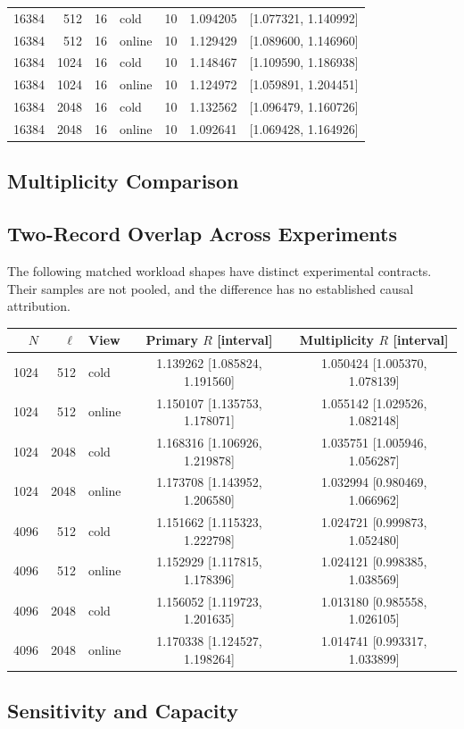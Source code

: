 \begin{longtable}{rrrlrrr}
16384 & 512 & 16 & cold & 10 & 1.094205 & [1.077321, 1.140992] \\
16384 & 512 & 16 & online & 10 & 1.129429 & [1.089600, 1.146960] \\
16384 & 1024 & 16 & cold & 10 & 1.148467 & [1.109590, 1.186938] \\
16384 & 1024 & 16 & online & 10 & 1.124972 & [1.059891, 1.204451] \\
16384 & 2048 & 16 & cold & 10 & 1.132562 & [1.096479, 1.160726] \\
16384 & 2048 & 16 & online & 10 & 1.092641 & [1.069428, 1.164926] \\
\bottomrule\end{longtable}\normalsize
\subsection{Multiplicity Comparison}

\subsection{Two-Record Overlap Across Experiments}
The following matched workload shapes have distinct experimental contracts. Their samples are not pooled, and the difference has no established causal attribution.
\begin{longtable}{rrlcc}
\toprule $N$ & $\ell$ & View & Primary $R$ [interval] & Multiplicity $R$ [interval] \\ \midrule
1024 & 512 & cold & 1.139262 [1.085824, 1.191560] & 1.050424 [1.005370, 1.078139] \\
1024 & 512 & online & 1.150107 [1.135753, 1.178071] & 1.055142 [1.029526, 1.082148] \\
1024 & 2048 & cold & 1.168316 [1.106926, 1.219878] & 1.035751 [1.005946, 1.056287] \\
1024 & 2048 & online & 1.173708 [1.143952, 1.206580] & 1.032994 [0.980469, 1.066962] \\
4096 & 512 & cold & 1.151662 [1.115323, 1.222798] & 1.024721 [0.999873, 1.052480] \\
4096 & 512 & online & 1.152929 [1.117815, 1.178396] & 1.024121 [0.998385, 1.038569] \\
4096 & 2048 & cold & 1.156052 [1.119723, 1.201635] & 1.013180 [0.985558, 1.026105] \\
4096 & 2048 & online & 1.170338 [1.124527, 1.198264] & 1.014741 [0.993317, 1.033899] \\
\bottomrule\end{longtable}
\subsection{Sensitivity and Capacity}



